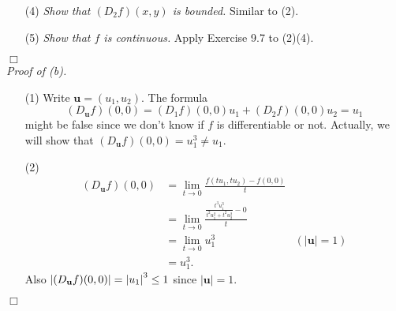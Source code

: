 \documentclass{article}
\begin{document}
\begin{enumerate}
\item[(4)]
  \emph{Show that $(D_2 f)(x,y)$ is bounded.}
  Similar to (2).

\item[(5)]
  \emph{Show that $f$ is continuous.}
  Apply Exercise 9.7 to (2)(4).
\end{enumerate}
$\Box$ \\



\emph{Proof of (b).}
\begin{enumerate}
\item[(1)]
  Write $\mathbf{u} = (u_1, u_2)$.
  The formula
  \[
    (D_{\mathbf{u}}f)(0,0) = (D_1 f)(0,0)u_1 + (D_2 f)(0,0)u_2 = u_1
  \]
  might be false since we don't know if $f$ is differentiable or not.
  Actually, we will show that $(D_{\mathbf{u}}f)(0,0) = u_1^3 \neq u_1$.

\item[(2)]
  \begin{align*}
    (D_{\mathbf{u}}f)(0,0)
    &= \lim_{t \to 0} \frac{f(tu_1,tu_2) - f(0,0)}{t} \\
    &= \lim_{t \to 0} \frac{\frac{t^3u_1^3}{t^2u_1^2 + t^2u_2^2} - 0}{t} \\
    &= \lim_{t \to 0} u_1^3
      & (|\mathbf{u}| = 1) \\
    &= u_1^3.
  \end{align*}
  Also $\abs{(D_{\mathbf{u}}f)(0,0)} = \abs{u_1}^3 \leq 1$
  since $|\mathbf{u}| = 1$.
\end{enumerate}
$\Box$ \\
\end{document}
